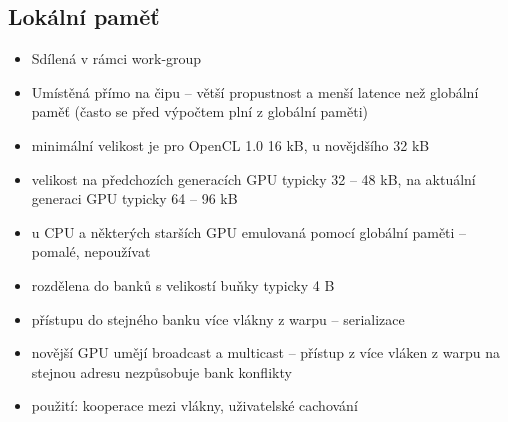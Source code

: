 	\subsection*{Lokální paměť}
		\label{subsec:lokalni_pamet}
		\begin{itemize}
			\setlength\itemsep{0em}
			\item Sdílená v rámci work-group
			\item Umístěná přímo na čipu -- větší propustnost a menší latence než globální paměť (často se před výpočtem plní z globální paměti)
			\item minimální velikost je pro OpenCL 1.0 16 kB, u novějdšího 32 kB
			\item velikost na předchozích generacích GPU typicky 32 -- 48 kB, na aktuální generaci GPU typicky 64 -- 96 kB
			\item u CPU a některých starších GPU emulovaná pomocí globální paměti -- pomalé, nepoužívat
			\item rozdělena do banků s velikostí buňky typicky 4 B
			\item přístupu do stejného banku více vlákny z warpu -- serializace
			\item novější GPU umějí broadcast a multicast -- přístup z více vláken z warpu na stejnou adresu nezpůsobuje bank konflikty
			\item použití: kooperace mezi vlákny, uživatelské cachování
		\end{itemize}
	
	
